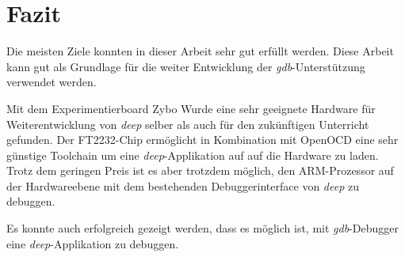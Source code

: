 \section{Fazit}
Die meisten Ziele konnten in dieser Arbeit sehr gut erfüllt werden.
Diese Arbeit kann gut als Grundlage für die weiter Entwicklung der \textit{gdb}-Unterstützung verwendet werden.

Mit dem Experimentierboard Zybo Wurde eine sehr geeignete Hardware für Weiterentwicklung von \textit{deep} selber als auch für den zukünftigen Unterricht gefunden.
Der FT2232-Chip ermöglicht in Kombination mit OpenOCD eine sehr günstige Toolchain um eine \textit{deep}-Applikation auf auf die Hardware zu laden.
Trotz dem geringen Preis ist es aber trotzdem möglich, den ARM-Prozessor auf der Hardwareebene mit dem bestehenden Debuggerinterface von \textit{deep} zu debuggen.

Es konnte auch erfolgreich gezeigt werden, dass es möglich ist, mit \textit{gdb}-Debugger eine \textit{deep}-Applikation zu debuggen.










































